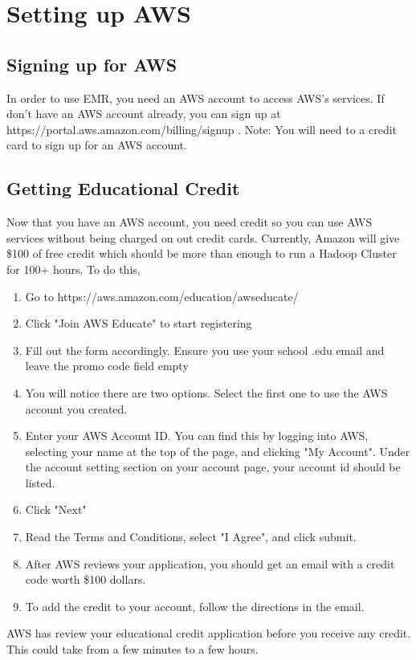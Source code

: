 \documentclass{article}
\begin{document}
\section{Setting up AWS}
\subsection{Signing up for AWS}
In order to use EMR, you need an AWS account to access AWS's services. If don't have an AWS account already,  you can sign up at https://portal.aws.amazon.com/billing/signup . Note: You will need to a credit card to sign up for an AWS account. 
\subsection{Getting Educational Credit}
Now that you have an AWS account, you need credit so you can use AWS services without being charged on out credit cards. Currently, Amazon will give \$100 of free credit which should be more than enough to run a Hadoop Cluster for 100+ hours. To do this, 
\begin{enumerate}
    \item Go to https://aws.amazon.com/education/awseducate/
    \item Click "Join AWS Educate" to start registering
    \item Fill out the form accordingly. Ensure you use your school .edu email and leave the promo code field empty
    \item You will notice there are two options. Select the first one to use the AWS account you created.
    \item Enter your AWS Account ID. You can find this by logging into AWS, selecting your name at the top of the page, and clicking "My Account". Under the account setting section on your account page, your account id should be listed. 
    \item Click "Next"
    \item Read the Terms and Conditions, select "I Agree", and click submit. 
    \item After AWS reviews your application, you should get an email with a credit code worth \$100 dollars.
    \item To add the credit to your account, follow the directions in the email.
\end{enumerate}

\begin{info}
AWS has review your educational credit application before you receive any credit. This could take from a few minutes to a few hours. 
\end{info}
\end{document}
